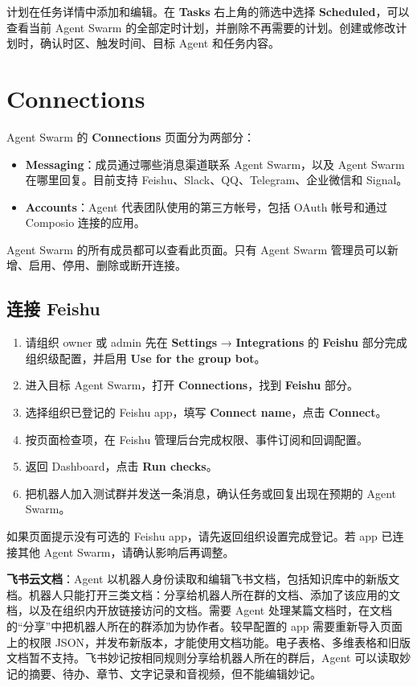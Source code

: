 \documentclass[UTF8,a4paper,11pt]{ctexart}
\begin{document}
计划在任务详情中添加和编辑。在 \textbf{Tasks} 右上角的筛选中选择 \textbf{Scheduled}，可以查看当前 Agent Swarm 的全部定时计划，并删除不再需要的计划。创建或修改计划时，确认时区、触发时间、目标 Agent 和任务内容。

\section{Connections}

Agent Swarm 的 \textbf{Connections} 页面分为两部分：

\begin{itemize}
  \item \textbf{Messaging}：成员通过哪些消息渠道联系 Agent Swarm，以及 Agent Swarm 在哪里回复。目前支持 Feishu、Slack、QQ、Telegram、企业微信和 Signal。
  \item \textbf{Accounts}：Agent 代表团队使用的第三方帐号，包括 OAuth 帐号和通过 Composio 连接的应用。
\end{itemize}

Agent Swarm 的所有成员都可以查看此页面。只有 Agent Swarm 管理员可以新增、启用、停用、删除或断开连接。

\subsection{连接 Feishu}

\begin{enumerate}
  \item 请组织 owner 或 admin 先在 \textbf{Settings} → \textbf{Integrations} 的 \textbf{Feishu} 部分完成组织级配置，并启用 \textbf{Use for the group bot}。
  \item 进入目标 Agent Swarm，打开 \textbf{Connections}，找到 \textbf{Feishu} 部分。
  \item 选择组织已登记的 Feishu app，填写 \textbf{Connect name}，点击 \textbf{Connect}。
  \item 按页面检查项，在 Feishu 管理后台完成权限、事件订阅和回调配置。
  \item 返回 Dashboard，点击 \textbf{Run checks}。
  \item 把机器人加入测试群并发送一条消息，确认任务或回复出现在预期的 Agent Swarm。
\end{enumerate}

如果页面提示没有可选的 Feishu app，请先返回组织设置完成登记。若 app 已连接其他 Agent Swarm，请确认影响后再调整。

\textbf{飞书云文档}：Agent 以机器人身份读取和编辑飞书文档，包括知识库中的新版文档。机器人只能打开三类文档：分享给机器人所在群的文档、添加了该应用的文档，以及在组织内开放链接访问的文档。需要 Agent 处理某篇文档时，在文档的“分享”中把机器人所在的群添加为协作者。较早配置的 app 需要重新导入页面上的权限 JSON，并发布新版本，才能使用文档功能。电子表格、多维表格和旧版文档暂不支持。飞书妙记按相同规则分享给机器人所在的群后，Agent 可以读取妙记的摘要、待办、章节、文字记录和音视频，但不能编辑妙记。
\end{document}
